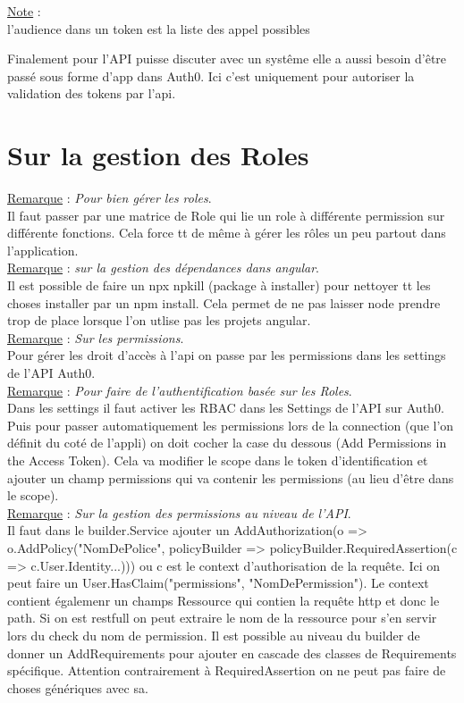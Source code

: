 \documentclass[a4paper,12pt,twoside]{article}
\newcommand{\rem}[2]{\noindent\underline{Remarque} : \textit{#1}.\\ \indent #2}
\newcommand{\note}[1]{\noindent\underline{Note} : \\ \indent #1}
\begin{document}
\note{l'audience dans un token est la liste des appel possibles}

Finalement pour l'API puisse discuter avec un systême elle a aussi besoin d'être passé sous forme d'app dans Auth0. Ici c'est uniquement pour autoriser la validation des tokens par l'api.\\

\section{Sur la gestion des Roles}

\rem{Pour bien gérer les roles}{Il faut passer par une matrice de Role qui lie un role à différente permission sur différente fonctions. Cela force tt de même à gérer les rôles un peu partout dans l'application.}\\

\rem{sur la gestion des dépendances dans angular}{Il est possible de faire un npx npkill (package à installer) pour nettoyer tt les choses installer par un npm install. Cela permet de ne pas laisser node prendre trop de place lorsque l'on utlise pas les projets angular.}\\

\rem{Sur les permissions}{Pour gérer les droit d'accès à l'api on passe par les permissions dans les settings de l'API Auth0.}\\

\rem{Pour faire de l'authentification basée sur les Roles}{Dans les settings il faut activer les RBAC dans les Settings de l'API sur Auth0. Puis pour passer automatiquement les permissions lors de la connection (que l'on définit du coté  de l'appli) on doit cocher la case du dessous (Add Permissions in the Access Token). Cela va modifier le scope dans le token d'identification et ajouter un champ permissions qui va contenir les permissions (au lieu d'être dans le scope).}\\

\rem{Sur la gestion des permissions au niveau de l'API}{Il faut dans le builder.Service ajouter un AddAuthorization(o => o.AddPolicy("NomDePolice", policyBuilder => policyBuilder.RequiredAssertion(c => c.User.Identity...))) ou c est le context d'authorisation de la requête. Ici on peut faire un User.HasClaim("permissions", "NomDePermission"). Le context contient égalemenr un champs Ressource qui contien la requête http et donc le path. Si on est restfull on peut extraire le nom de la ressource pour s'en servir lors du check du nom de permission. Il est possible au niveau du builder de donner un AddRequirements pour ajouter en cascade des classes de Requirements spécifique. Attention contrairement à RequiredAssertion on ne peut pas faire de choses génériques avec sa.}\\
\end{document}
